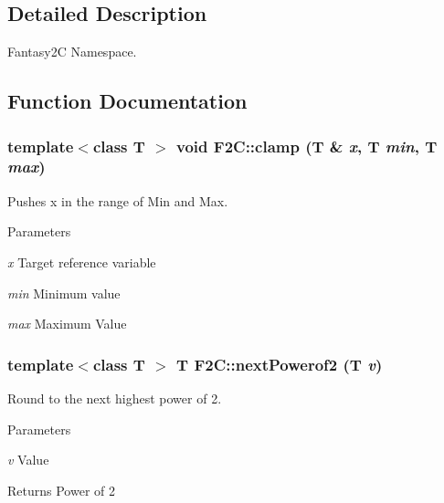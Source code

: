 \subsection{Detailed Description}
Fantasy2C Namespace. 

\subsection{Function Documentation}
\hypertarget{namespace_f2_c_a9255a9f561e2a53a172170c17daebccd}{
\subsubsection[{clamp}]{\setlength{\rightskip}{0pt plus 5cm}template$<$class T $>$ void F2C::clamp (T \& {\em x}, \/  T {\em min}, \/  T {\em max})}}
\label{namespace_f2_c_a9255a9f561e2a53a172170c17daebccd}


Pushes x in the range of Min and Max. 
\begin{DoxyParams}{Parameters}
\item[{\em x}]Target reference variable \item[{\em min}]Minimum value \item[{\em max}]Maximum Value \end{DoxyParams}
\hypertarget{namespace_f2_c_a60c6d5786600a7d7bfb8c4bfafa55419}{
\subsubsection[{nextPowerof2}]{\setlength{\rightskip}{0pt plus 5cm}template$<$class T $>$ T F2C::nextPowerof2 (T {\em v})}}
\label{namespace_f2_c_a60c6d5786600a7d7bfb8c4bfafa55419}


Round to the next highest power of 2. 
\begin{DoxyParams}{Parameters}
\item[{\em v}]Value \end{DoxyParams}
\begin{DoxyReturn}{Returns}
Power of 2 
\end{DoxyReturn}
